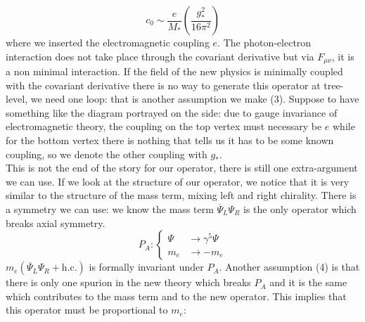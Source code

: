 \documentclass[../main.tex]{subfiles}
\begin{document}
\begin{example}
\[
c_0\sim\frac{e}{M_*}\left(\frac{g_*^2}{16\pi^2}\right)
\]
where we inserted the electromagnetic coupling $e$. The photon-electron interaction does not take place through the covariant derivative but via $F_{\mu\nu}$, it is a non minimal interaction. If the field of the new physics is minimally coupled with the covariant derivative there is no way to generate this operator at tree-level, we need one loop: that is another assumption we make (3). Suppose to have something like the diagram portrayed on the side: due to gauge invariance of electromagnetic theory, the coupling on the top vertex must necessary be $e$ while for the bottom vertex there is nothing that tells us it has to be some known coupling, so we denote the other coupling with $g_*$.\\
This is not the end of the story for our operator, there is still one extra-argument we can use. If we look at the structure of our operator, we notice that it is very similar to the structure of the mass term, mixing left and right chirality. There is a symmetry we can use: we know the mass term $\overline{\Psi}_L\Psi_R$ is the only operator which breaks axial symmetry.
\[
P_A:
\left\{
\begin{aligned}
\Psi&\to\gamma^5\Psi\\
m_e&\to-m_e
\end{aligned}
\right.
\]
$m_e(\overline{\Psi}_L\Psi_R+\text{h.c.})$ is formally invariant under $P_A$. Another assumption (4) is that there is only one spurion in the new theory which breaks $P_A$ and it is the same which contributes to the mass term and to the new operator. This implies that this operator must be proportional to $m_e$:

\end{example}
\end{document}
